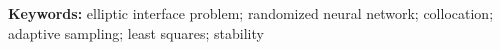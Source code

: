 \documentclass[UTF8,12pt,oneside]{ctexbook}
\theoremstyle{definition}
\begin{document}
\noindent\textbf{Keywords:} elliptic interface problem; randomized neural network; collocation; adaptive sampling; least squares; stability
\tableofcontents
\mainmatter






\appendix

\backmatter

\end{document}
